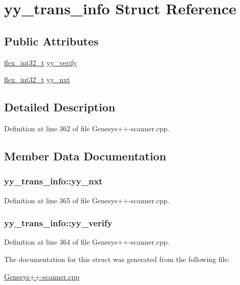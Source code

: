 \hypertarget{structyy__trans__info}{\section{yy\-\_\-trans\-\_\-info Struct Reference}
\label{structyy__trans__info}
}
\subsection*{Public Attributes}
\begin{DoxyCompactItemize}
\item 
\hyperlink{_genesys_09_09-scanner_8cpp_a838ce943cf44ef7769480714fc6c3ba9}{flex\-\_\-int32\-\_\-t} \hyperlink{structyy__trans__info_a5c9f61e770deef50bd4e697310342fe9}{yy\-\_\-verify}
\item 
\hyperlink{_genesys_09_09-scanner_8cpp_a838ce943cf44ef7769480714fc6c3ba9}{flex\-\_\-int32\-\_\-t} \hyperlink{structyy__trans__info_ae0715250c2bef261e596e77e0030f13e}{yy\-\_\-nxt}
\end{DoxyCompactItemize}


\subsection{Detailed Description}


Definition at line 362 of file Genesys++-\/scanner.\-cpp.



\subsection{Member Data Documentation}
\hypertarget{structyy__trans__info_ae0715250c2bef261e596e77e0030f13e}{
\subsubsection[{yy\-\_\-nxt}]{ yy\-\_\-trans\-\_\-info\-::yy\-\_\-nxt}}\label{structyy__trans__info_ae0715250c2bef261e596e77e0030f13e}


Definition at line 365 of file Genesys++-\/scanner.\-cpp.

\hypertarget{structyy__trans__info_a5c9f61e770deef50bd4e697310342fe9}{
\subsubsection[{yy\-\_\-verify}]{ yy\-\_\-trans\-\_\-info\-::yy\-\_\-verify}}\label{structyy__trans__info_a5c9f61e770deef50bd4e697310342fe9}


Definition at line 364 of file Genesys++-\/scanner.\-cpp.



The documentation for this struct was generated from the following file\-:\begin{DoxyCompactItemize}
\item 
\hyperlink{_genesys_09_09-scanner_8cpp}{Genesys++-\/scanner.\-cpp}\end{DoxyCompactItemize}
